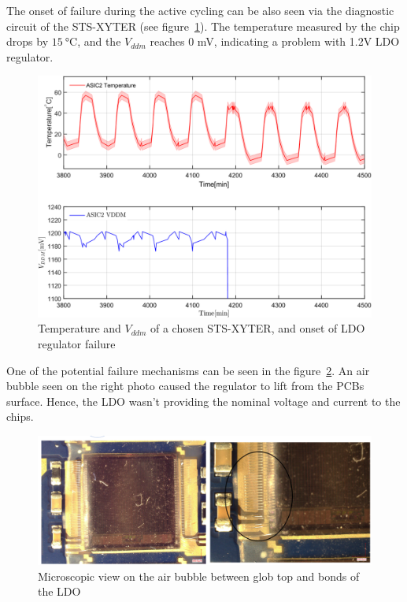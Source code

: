 The onset of failure during the active cycling can be also seen via the diagnostic circuit of the STS-XYTER (see figure~\ref{fig_active_failure}). The temperature measured by the chip drops by $\SI{15}{\celsius}$, and the $V_{ddm}$ reaches 0 mV, indicating a problem with 1.2V \gls{LDO} regulator. 

\begin{figure}[!h]
\centering
\includegraphics[width=0.6\columnwidth]{Chapter4/images/FEB2ASIC2COMP1.png}
\caption{Temperature and $V_{ddm}$ of a chosen STS-XYTER, and onset of \gls{LDO} regulator failure}
\label{fig_active_failure}
\end{figure}

One of the potential failure mechanisms can be seen in the figure~\ref{fig_ldo_lift}. An air bubble seen on the right photo caused the regulator to lift from the \glspl{PCB} surface. Hence, the \gls{LDO} wasn't providing the nominal voltage and current to the chips. 

\begin{figure}[!h]
\centering
\includegraphics[width=0.8\columnwidth]{Chapter4/images/FEB_81_LDO_lift.png}
\caption{Microscopic view on the air bubble between glob top and bonds of the \gls{LDO}}
\label{fig_ldo_lift}
\end{figure}
\newpage
